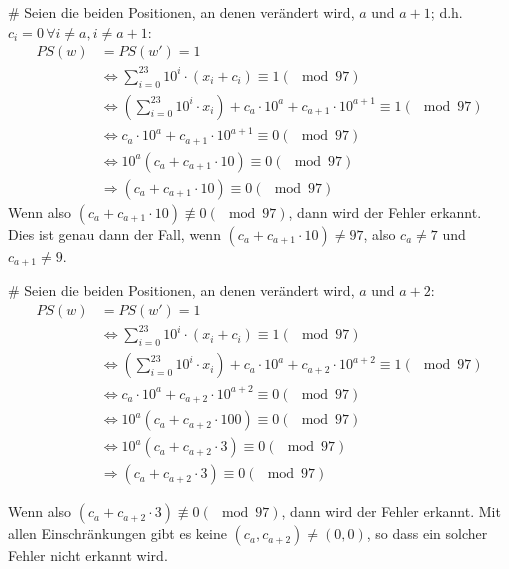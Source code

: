 \begin{myList}
#
Seien die beiden Positionen, an denen verändert wird, $a$ und $a+1$; d.h. $c_i=0\,\forall i\not= a, i\not=a+1$:
\begin{align*}
	PS(w) &= PS(w') = 1 \\
	 &\Leftrightarrow \sum_{i = 0}^{23} 10^i \cdot (x_i + c_i) \equiv 1 (\mod 97) \\
	  &\Leftrightarrow \left(\sum_{i = 0}^{23} 10^i \cdot x_i \right) + c_a \cdot 10^a + c_{a+1} \cdot 10^{a+1} \equiv 1 (\mod 97) \\
	  &\Leftrightarrow c_a \cdot 10^a + c_{a+1} \cdot 10^{a+1} \equiv 0 (\mod 97) \\
	  &\Leftrightarrow 10^a (c_a + c_{a+1} \cdot 10) \equiv 0 (\mod 97) \\
	  &\Rightarrow (c_a + c_{a+1} \cdot 10) \equiv 0 (\mod 97)
\end{align*}
Wenn also  $(c_a + c_{a+1} \cdot 10) \not\equiv 0 (\mod 97)$, dann wird der Fehler erkannt. Dies ist genau dann der Fall, wenn $(c_a + c_{a+1} \cdot 10) \not= 97$, also $c_a\not=7$ und $c_{a+1}\not=9$.

#
Seien die beiden Positionen, an denen verändert wird, $a$ und $a+2$:
\begin{align*}
	PS(w) &= PS(w') = 1 \\
	&\Leftrightarrow \sum_{i = 0}^{23} 10^i \cdot (x_i + c_i) \equiv 1 (\mod 97) \\
	&\Leftrightarrow \left(\sum_{i = 0}^{23} 10^i \cdot x_i \right) + c_a \cdot 10^a + c_{a+2} \cdot 10^{a+2} \equiv 1 (\mod 97) \\
	  &\Leftrightarrow c_a \cdot 10^a + c_{a+2} \cdot 10^{a+2} \equiv 0 (\mod 97) \\
	  &\Leftrightarrow 10^a (c_a + c_{a+2} \cdot 100) \equiv 0 (\mod 97) \\
	  &\Leftrightarrow 10^a (c_a + c_{a+2} \cdot 3) \equiv 0 (\mod 97) \\
	  &\Rightarrow (c_a + c_{a+2} \cdot 3) \equiv 0 (\mod 97)
\end{align*}

Wenn also $(c_a + c_{a+2} \cdot 3) \not\equiv 0 (\mod 97)$, dann wird der Fehler erkannt. Mit allen Einschränkungen gibt es keine $(c_a, c_{a+2})\not=(0, 0)$, so dass ein solcher Fehler nicht erkannt wird.


\end{myList}
